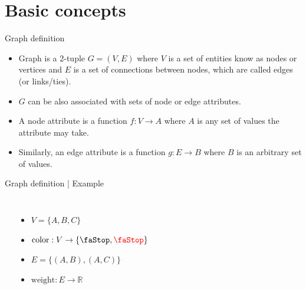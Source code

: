 \documentclass[
    hyperref={colorlinks,linkcolor=blue,urlcolor=blue,citecolor=blue}
]{beamer}
\newcommand{\red}[1]{\textcolor{red}{#1}}
\begin{document}
\section{Basic concepts}

\begin{frame}{Graph definition}
\begin{itemize}
    \item<1-> Graph is a 2-tuple $G = (V, E)$ where $V$ is a set of entities
    know as nodes or vertices and $E$ is a set of connections between
    nodes, which are called edges (or links/ties).
    \item<2-> $G$ can be also associated with sets of node or edge attributes.
    \item<3-> A node attribute is a function $f: V \to A$ where $A$ is any
    set of values the attribute may take.
    \item<4-> Similarly, an edge attribute is a function $g: E \to B$ where
    $B$ is an arbitrary set of values.
\end{itemize}
\end{frame}

\begin{frame}{Graph definition | Example}
\begin{columns}
    \begin{center}
    \end{center}
    \begin{itemize}
        \item<2-> $V = \{A, B, C\}$
        \item<3-> $\text{color}: V \to \{\text{\faStop}, \text{\red{\faStop}}\}$
        \item<4-> $E = \{(A, B), (A, C)\}$
        \item<5-> $\text{weight}: E \to \mathbb{R}$
    \end{itemize}
\end{columns}
\end{frame}
\end{document}
